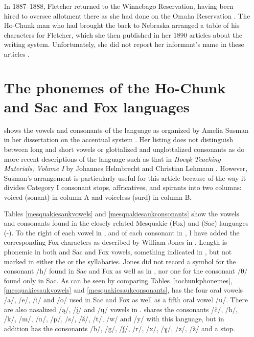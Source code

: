 \documentclass[output=paper]{LSP/langsci}
\begin{document}
In 1887--1888, Fletcher returned to the Winnebago Reservation, having been hired to oversee allotment there as she had done on the Omaha Reservation \citep[162]{Mark1988}. The Ho-Chunk man who had brought the   back to Nebraska arranged a table of his   characters for Fletcher, which she then published in her 1890 articles about the writing system. Unfortunately, she did not report her informant's name in these articles \citep[300]{Fletcher1890a}.

\section{The phonemes of the {Ho-Chunk} and Sac and Fox languages}\largerpage


 shows the vowels and consonants of the  language as organized by Amelia Susman in her dissertation on the  accentual system \citeyearpar[15]{Susman1943}. Her listing does not distinguish between long and short vowels or glottalized and unglottalized consonants as do more recent descriptions of the language such as that in \emph{Hoc\k{a}k Teaching Materials, Volume I} by Johannes Helmbrecht and Christian Lehmann \citeyearpar[5--7]{HelmbrechtLehmann2010}. However, Susman's arrangement is particularly useful for this article because of the way it divides Category I consonant stops, affricatives, and spirants into two columns: voiced (sonant) in column A and voiceless (surd) in column B. 

Tables \ref{mesquakiesaukvowels} and \ref{mesquakiesaukconsonants} show the vowels and consonants found in the closely related Mes\-qua\-kie (Fox) and  (Sac) languages (-). To the right of each vowel in , and of each consonant in , I have added the corresponding Fox  characters as described by William Jones in \citeyear{Jones1906}. Length is phonemic in both  and Sac and Fox vowels, something indicated in , but not marked in either the  or the  syllabaries. Jones did not record a  symbol for the consonant /h/ found in Sac and Fox as well as in , nor one for the consonant /θ/ found only in Sac. As can be seen by comparing Tables \ref{hochunkphonemes}, \ref{mesquakiesaukvowels} and \ref{mesquakiesaukconsonants},  has the four oral vowels /a/, /e/, /i/ and /o/ used in Sac and Fox as well as a fifth  oral vowel /u/. There are also nasalized /\k{a}/, /\k{i}/ and /\k{u}/ vowels in .  shares the consonants /č/, /h/, /k/, /m/, /n/, /p/, /s/, /\v{s}/, /t/, /w/ and /y/ with this  language, but in addition has the consonants /b/, /g/, /\v{j}/, /r/, /x/, /ɣ/, /z/, /\v{z}/ and a  stop.\largerpage
\end{document}
